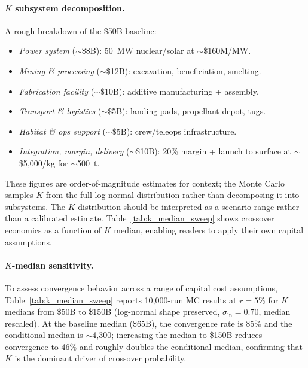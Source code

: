 \documentclass[preprint,12pt]{elsarticle}
\begin{document}
\paragraph{$K$ subsystem decomposition.} A rough breakdown of the \$50B baseline:
\begin{itemize}
  \item \emph{Power system} (${\sim}$\$8B): 50~MW nuclear/solar at ${\sim}$\$160M/MW.
  \item \emph{Mining \& processing} (${\sim}$\$12B): excavation, beneficiation, smelting.
  \item \emph{Fabrication facility} (${\sim}$\$10B): additive manufacturing + assembly.
  \item \emph{Transport \& logistics} (${\sim}$\$5B): landing pads, propellant depot, tugs.
  \item \emph{Habitat \& ops support} (${\sim}$\$5B): crew/teleops infrastructure.
  \item \emph{Integration, margin, delivery} (${\sim}$\$10B): 20\% margin + launch to surface at ${\sim}$\$5{,}000/kg for ${\sim}$500~t.
\end{itemize}
These figures are order-of-magnitude estimates for context; the Monte Carlo samples $K$ from the full log-normal distribution rather than decomposing it into subsystems. The $K$ distribution should be interpreted as a scenario range rather than a calibrated estimate. Table~\ref{tab:k_median_sweep} shows crossover economics as a function of $K$ median, enabling readers to apply their own capital assumptions.

\paragraph{$K$-median sensitivity.} To assess convergence behavior across a range of capital cost assumptions, Table~\ref{tab:k_median_sweep} reports 10{,}000-run MC results at $r = 5\%$ for $K$ medians from \$50B to \$150B (log-normal shape preserved, $\sigma_{\ln} = 0.70$, median rescaled). At the baseline median (\$65B), the convergence rate is 85\% and the conditional median is $\sim$4{,}300; increasing the median to \$150B reduces convergence to 46\% and roughly doubles the conditional median, confirming that $K$ is the dominant driver of crossover probability.
\end{document}
